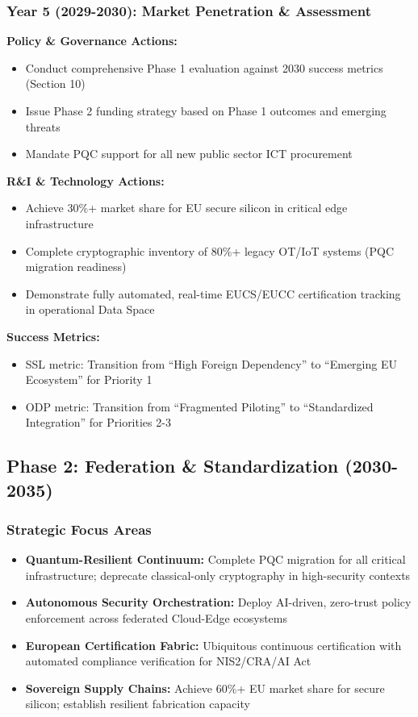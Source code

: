 \documentclass[12pt,a4paper]{article}
\begin{document}
\subsubsection*{Year 5 (2029-2030): Market Penetration \& Assessment}
\textbf{Policy \& Governance Actions:}
\begin{itemize}
    \item Conduct comprehensive Phase 1 evaluation against 2030 success metrics (Section 10)
    \item Issue Phase 2 funding strategy based on Phase 1 outcomes and emerging threats
    \item Mandate PQC support for all new public sector ICT procurement
\end{itemize}

\textbf{R\&I \& Technology Actions:}
\begin{itemize}
    \item Achieve 30\%+ market share for EU secure silicon in critical edge infrastructure
    \item Complete cryptographic inventory of 80\%+ legacy OT/IoT systems (PQC migration readiness)
    \item Demonstrate fully automated, real-time EUCS/EUCC certification tracking in operational Data Space
\end{itemize}

\textbf{Success Metrics:}
\begin{itemize}
    \item SSL metric: Transition from ``High Foreign Dependency'' to ``Emerging EU Ecosystem'' for Priority 1
    \item ODP metric: Transition from ``Fragmented Piloting'' to ``Standardized Integration'' for Priorities 2-3
\end{itemize}

\subsection*{Phase 2: Federation \& Standardization (2030-2035)}

\subsubsection*{Strategic Focus Areas}
\begin{itemize}
    \item \textbf{Quantum-Resilient Continuum:} Complete PQC migration for all critical infrastructure; deprecate classical-only cryptography in high-security contexts
    \item \textbf{Autonomous Security Orchestration:} Deploy AI-driven, zero-trust policy enforcement across federated Cloud-Edge ecosystems
    \item \textbf{European Certification Fabric:} Ubiquitous continuous certification with automated compliance verification for NIS2/CRA/AI Act
    \item \textbf{Sovereign Supply Chains:} Achieve 60\%+ EU market share for secure silicon; establish resilient fabrication capacity
\end{itemize}
\end{document}
